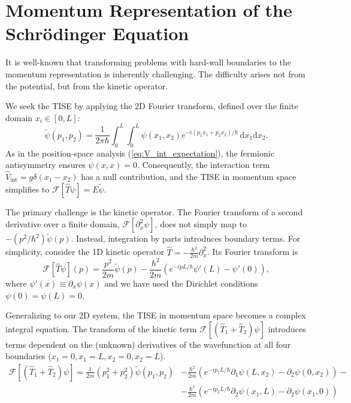 \section{Momentum Representation of the Schr\"odinger Equation} \label{sec:momentum}

It is well-known that transforming problems with hard-wall boundaries
to the momentum representation is inherently challenging.
The difficulty arises not from the potential, but from the
kinetic operator.

We seek the TISE by applying the 2D Fourier transform,
defined over the finite domain $x_i \in [0, L]$:
\begin{equation}
	\tilde{\psi}(p_1, p_2) = \frac{1}{2\pi \hbar} \int_0^L \int_0^L \psi(x_1, x_2)
	e^{-i (p_1 x_1 + p_2 x_2)/ \hbar} \, \mathrm{d}x_1 \mathrm{d}x_2.
\end{equation}
As in the position-space analysis (\cref{eq:V_int_expectation}),
the fermionic antisymmetry ensures $\psi(x, x) = 0$. Consequently,
the interaction term $\hat{V}_{\text{int}} = g\delta(x_1 - x_2)$
has a null contribution, and the TISE in momentum space simplifies to
$\mathcal{F}[\hat{T}\psi] = E \tilde{\psi}$.

The primary challenge is the kinetic operator. The Fourier transform
of a second derivative over a finite domain, $\mathcal{F}[\partial_x^2 \psi]$,
does not simply map to $-(p^2/\hbar^2) \tilde{\psi}(p)$.
Instead, integration by parts introduces boundary terms.
For simplicity, consider the 1D kinetic operator $\hat{T} =
-\frac{\hbar^2}{2m}\partial_x^2$. Its Fourier transform is
\begin{equation} \label{eq:ft_kinetic_1d}
	\mathcal{F}[\hat{T}\psi](p) = \frac{p^2}{2m} \tilde{\psi}(p)
	- \frac{\hbar^2}{2m} \left( e^{-i p L/\hbar} \psi'(L) - \psi'(0) \right),
\end{equation}
where $\psi'(x) \equiv \partial_x \psi(x)$ and we have used the
Dirichlet conditions $\psi(0) = \psi(L) = 0$.

Generalizing to our 2D system, the TISE in momentum space
becomes a complex integral equation. The transform of the kinetic term
$\mathcal{F}[(\hat{T}_1 + \hat{T}_2)\psi]$ introduces terms dependent
on the (unknown) derivatives of the wavefunction at all four boundaries
($x_1=0, x_1=L, x_2=0, x_2=L$).
\begin{equation}
	\begin{split}
		\mathcal{F}[(\hat{T}_1 + \hat{T}_2)\psi] = \frac{1}{2m}(p_1^2 + p_2^2)
		\tilde{\psi}(p_1, p_2) &- \frac{\hbar^2}{2m} \left( e^{-i p_1 L / \hbar} \partial_1 \psi(L, x_2) -
		\partial_2 \psi(0, x_2) \right) - \\
													 &- \frac{\hbar^2}{2m} \left(e^{-i p_2 L / \hbar} \partial_2 \psi(x_1, L) - \partial_2 \psi(x_1, 0) \right)
		\end{split}
\end{equation}

